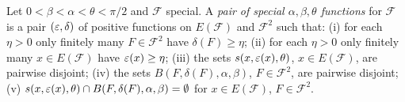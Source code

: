 \begin{definition}\label{def:special-pair}
Let $0<\beta<\alpha<\theta<\pi/2$ and $\mathcal F$ special. A \emph{pair of special $\alpha,\beta,\theta$ functions} for
$\mathcal F$ is a pair $(\varepsilon,\delta)$ of positive functions on $E(\mathcal F)$ and $\mathcal F^2$ such that:
(i) for each $\eta>0$ only finitely many $F\in\mathcal F^2$ have $\delta(F)\ge\eta$;
(ii) for each $\eta>0$ only finitely many $x\in E(\mathcal F)$ have $\varepsilon(x)\ge\eta$;
(iii) the sets $s(x,\varepsilon(x),\theta)$, $x\in E(\mathcal F)$, are pairwise disjoint;
(iv) the sets $B(F,\delta(F),\alpha,\beta)$, $F\in\mathcal F^2$, are pairwise disjoint;
(v) $s(x,\varepsilon(x),\theta)\cap B(F,\delta(F),\alpha,\beta)=\emptyset$ for $x\in E(\mathcal F)$, $F\in\mathcal F^2$.
\end{definition}

